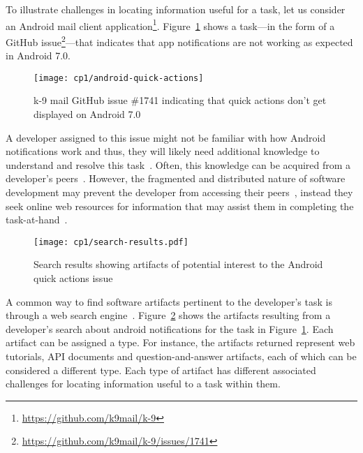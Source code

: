  To illustrate challenges in locating information useful for a task, let us consider an  Android mail client application\footnote{\url{https://github.com/k9mail/k-9}}.
 Figure~\ref{fig:android-notifications-task} shows a task---in the form of a GitHub issue\footnote{\url{https://github.com/k9mail/k-9/issues/1741}}---that indicates that 
 app notifications 
 are not working as expected in Android 7.0. 
 
 \medskip
 \begin{figure}[h!]
     \centering
     \texttt{[image: cp1/android-quick-actions]}
     \caption{k-9 mail GitHub issue \#1741 indicating that quick actions don't get displayed on Android 7.0}
     \label{fig:android-notifications-task}
 \end{figure}
 
 
 \medskip
 A developer assigned to this issue might not be familiar with how Android notifications work and thus, they will likely need additional knowledge to understand and resolve this task~\cite{ko2007, Li2013, sillito2006}. 
 Often, this knowledge can be acquired from a developer's peers~\cite{singer2011}. 
 However, the fragmented and distributed nature of software development  
 may prevent the developer from accessing their peers~\cite{ko2007},
 instead they seek online web resources for information 
 that may assist them in completing the task-at-hand~\cite{Xia2017, rao2020}.
 
 
 
 
 
 \begin{figure}
     \centering
     \texttt{[image: cp1/search-results.pdf]}
     \caption{Search results showing artifacts of potential interest to the Android quick actions issue}
     \label{fig:android-search-results}
 \end{figure}
 
 
 
A common way to find software artifacts
pertinent to the developer's task
is through a web search engine~\cite{Brandt2009a, Li2013}.
Figure~\ref{fig:android-search-results}
shows the artifacts resulting from a developer's search 
about android notifications for the task in Figure~\ref{fig:android-notifications-task}.
Each artifact can be assigned a type. For instance,
the artifacts returned represent web tutorials, API documents and question-and-answer
artifacts, each of which can be considered a different type.
Each type of artifact has different associated challenges for locating 
information useful to a task within them.



